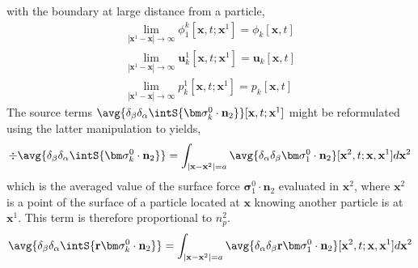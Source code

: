 with the boundary at large distance from a particle, 
\begin{align*}
    \lim_{|\textbf{x}^1 - \textbf{x}| \to \infty} \phi_1^k[\textbf{x},t;\textbf{x}^1] = \phi_k[\textbf{x},t]\\
    \lim_{|\textbf{x}^1 - \textbf{x}| \to \infty} \textbf{u}_k^1[\textbf{x},t;\textbf{x}^1] = \textbf{u}_k[\textbf{x},t]\\
    \lim_{|\textbf{x}^1 - \textbf{x}| \to \infty} p_k^1[\textbf{x},t;\textbf{x}^1] = p_k[\textbf{x},t]
\end{align*}
The source terms $\avg{\delta_\beta\delta_\alpha \intS{\bm\sigma_k^0 \cdot \textbf{n}_2}}[\textbf{x},t;\textbf{x}^1]$ might be reformulated using the latter manipulation to yields, 
\begin{equation*}
    \div \avg{\delta_\beta\delta_\alpha \intS{\bm\sigma_k^0 \cdot \textbf{n}_2}}
    = 
    \int_{|\textbf{x}-\textbf{x}^2| = a}
    \avg{\delta_\alpha \delta_\beta \bm\sigma_1^0\cdot\textbf{n}_2}
    [\textbf{x}^2,t;\textbf{x},\textbf{x}^1]
    d\textbf{x}^2
\end{equation*}
which is the averaged value of the surface force $\bm\sigma_1^0\cdot\textbf{n}_2$ evaluated in $\textbf{x}^2$, where $\textbf{x}^2$ is a point of the surface of a particle located at $\textbf{x}$ knowing another particle is at $\textbf{x}^1$.
This term is therefore proportional to $n_p^2$.  
\begin{equation*}
    \avg{\delta_\beta\delta_\alpha \intS{\textbf{r}\bm\sigma_k^0 \cdot \textbf{n}_2}}
    = 
    \int_{|\textbf{x}-\textbf{x}^2| = a}
    \avg{\delta_\alpha \delta_\beta  \textbf{r}\bm\sigma_1^0\cdot\textbf{n}_2}
    [\textbf{x}^2,t;\textbf{x},\textbf{x}^1]
    d\textbf{x}^2
\end{equation*}








